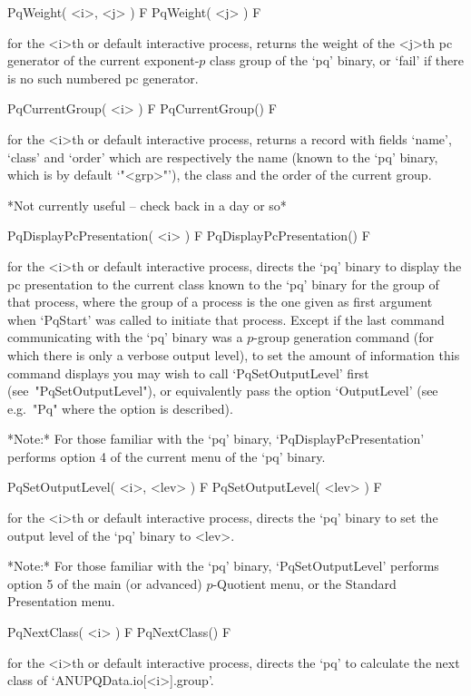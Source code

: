 \>PqWeight( <i>, <j> ) F
\>PqWeight( <j> ) F

for the <i>th or default interactive {\ANUPQ} process, returns the weight
of the <j>th pc generator of the current exponent-$p$ class group of  the
`pq' binary, or `fail' if there is no such numbered pc generator.

\>PqCurrentGroup( <i> ) F
\>PqCurrentGroup() F

for the <i>th or default interactive {\ANUPQ} process, returns  a  record
with fields `name', `class' and `order' which are respectively  the  name
(known to the `pq' binary, which is by default `"<grp>"'), the class  and
the order of the current group.

*Not currently useful -- check back in a day or so*

\>PqDisplayPcPresentation( <i> ) F
\>PqDisplayPcPresentation() F

for the <i>th or default interactive {\ANUPQ} process, directs  the  `pq'
binary to display the pc presentation to the current class known  to  the
`pq' binary for the group of that process, where the group of  a  process
is the one given as first argument when `PqStart' was called to  initiate
that process. Except if the last  command  communicating  with  the  `pq'
binary was a $p$-group generation command (for  which  there  is  only  a
verbose output level), to set the  amount  of  information  this  command
displays   you   may    wish    to    call    `PqSetOutputLevel'    first
(see~"PqSetOutputLevel"), or equivalently pass the  option  `OutputLevel'
(see e.g.~"Pq" where the option is described).

*Note:*
For  those  familiar  with  the  `pq'  binary,  `PqDisplayPcPresentation'
performs option 4 of the current menu of the `pq' binary.

\>PqSetOutputLevel( <i>, <lev> ) F
\>PqSetOutputLevel( <lev> ) F

for the <i>th or default interactive {\ANUPQ} process, directs  the  `pq'
binary to set the output level of the `pq' binary to <lev>.

*Note:* For those  familiar  with  the  `pq'  binary,  `PqSetOutputLevel'
performs option 5 of the main (or advanced)  $p$-Quotient  menu,  or  the
Standard Presentation menu.

\>PqNextClass( <i> ) F
\>PqNextClass() F

for the <i>th or default interactive {\ANUPQ} process, directs  the  `pq'
to calculate the next class of `ANUPQData.io[<i>].group'. 

